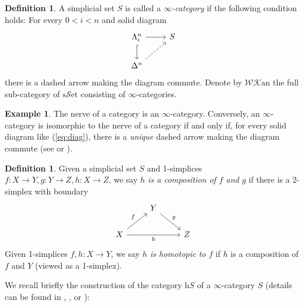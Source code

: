 \documentclass[a4paper]{book}
\newcommand{\lK}{\mathcal{K}}
\newcommand{\lS}{\mathcal{S}}
\newcommand{\lW}{\mathcal{W}}
\newcommand{\set}{\lS\mathrm{et}} %
\newcommand{\Ho}{\mathrm{h}} %
\newcommand{\sset}{\mathrm{s}\set} %
\newcommand{\Kan}{\lK\mathrm{an}} %
\newcommand{\WKan}{\lW\Kan} %
\theoremstyle{definition}
\newtheorem{definition}[equation]{Definition}
\newtheorem{example}[equation]{Example}
\theoremstyle{remark}
\numberwithin{equation}{section}
\begin{document}
\begin{definition}
	A simplicial set $S$ is called a \emph{$\infty$-category} if the following condition holds: For every $0< i< n$ and solid diagram \begin{equation}
    \begin{tikzcd}\label{eq:diag}
      \Lambda^n_i \arrow[d,hook]\arrow[r] & S  \\
      \Delta^n \arrow[ru,dashed]
    \end{tikzcd}
  \end{equation}there is a dashed arrow making the diagram commute. Denote by $\WKan$ the full sub-category of $\sset$ consisting of $\infty$-categories. 
\end{definition}
\begin{example}
  The nerve of a category is an $\infty$-category. Conversely, an $\infty$-category is isomorphic to the nerve of a category if and only if, for every solid diagram like (\ref{eq:diag}), there is a \emph{unique} dashed arrow making the diagram commute (see \cite[Proposition 1.1.2.2]{lurie2009htt} or \cite[Theorem 1.1.52]{land2021introduction}). 
\end{example}
\begin{definition}
	Given a simplicial set $S$ and 1-simplices $f:X\to Y,g:Y\to Z,h:X\to Z$, we say \emph{$h$ is a composition of $f$ and $g$} if there is a 2-simplex with boundary 
\begin{equation}
    \begin{tikzcd}
      & Y \arrow[dr,"g"] & \\
      X \arrow[ru,"f"] \arrow[rr,"h"'] & {} & Z 
    \end{tikzcd}
\end{equation}Given 1-simplices $f,h:X\to Y$, we say \emph{$h$ is homotopic to $f$} if $h$ is a composition of $f$ and $Y$ (viewed as a 1-simplex).  
\end{definition}
We recall briefly the construction of the category $\Ho S$ of a $\infty$-category $S$ (details can be found in \cite{lurie2009htt}, \cite[Tag 0049]{kerodon2026}, or \cite[Definition 1.2.5]{land2021introduction}):
\end{document}
